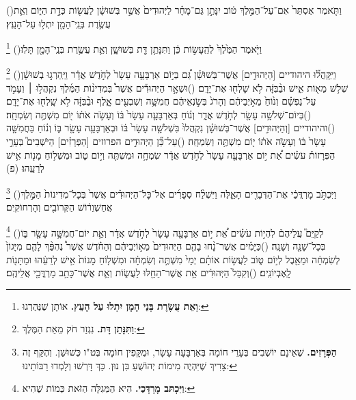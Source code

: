 \documentclass[12pt, openany]{book}
\newcommand{\footnotecomment}[1]{
	\renewcommand\thefootnote{}
	\footnote{\textsf{#1}}}
\newcommand{\commenta}[1]{\footnotecomment{#1}\hspace{0em}}
\newcommand{\vsnum}[1]{(\hebrewnumeral{#1})\space}
\begin{document}
\begin{multicols}{2}
\vsnum{13}וַתֹּ֤אמֶר אֶסְתֵּר֙ אִם־עַל־הַמֶּ֣לֶךְ ט֔וֹב יִנָּתֵ֣ן גַּם־מָחָ֗ר לַיְּהוּדִים֙ אֲשֶׁ֣ר בְּשׁוּשָׁ֔ן לַעֲשׂ֖וֹת כְּדָ֣ת הַיּ֑וֹם וְאֵ֛ת עֲשֶׂ֥רֶת בְּנֵֽי־הָמָ֖ן יִתְל֥וּ עַל־הָעֵֽץ׃%
\commenta{\textrm{\textbf{וְאֵת עֲשֶׂרֶת בְּנֵי הָמָן יִתְלוּ עַל הָעֵץ.}} אוֹתָן שֶׁנֶּהֶרְגוּ:}%
\vsnum{14}וַיֹּ֤אמֶר הַמֶּ֙לֶךְ֙ לְהֵֽעָשׂ֣וֹת כֵּ֔ן וַתִּנָּתֵ֥ן דָּ֖ת בְּשׁוּשָׁ֑ן וְאֵ֛ת עֲשֶׂ֥רֶת בְּנֵֽי־הָמָ֖ן תָּלֽוּ׃%
\commenta{\textrm{\textbf{וַתִּנָּתֵן דָּת.}} נִגְזַר חֹק מֵאֵת הַמֶּלֶךְ:}%
\vsnum{15}וַיִּֽקָּהֲל֞וּ היהודיים [הַיְּהוּדִ֣ים] אֲשֶׁר־בְּשׁוּשָׁ֗ן גַּ֠ם בְּי֣וֹם אַרְבָּעָ֤ה עָשָׂר֙ לְחֹ֣דֶשׁ אֲדָ֔ר וַיַּֽהַרְג֣וּ בְשׁוּשָׁ֔ן שְׁלֹ֥שׁ מֵא֖וֹת אִ֑ישׁ וּבַ֨בִּזָּ֔ה לֹ֥א שָׁלְח֖וּ אֶת־יָדָֽם׃
\vsnum{16}וּשְׁאָ֣ר הַיְּהוּדִ֡ים אֲשֶׁר֩ בִּמְדִינ֨וֹת הַמֶּ֜לֶךְ נִקְהֲל֣וּ ׀ וְעָמֹ֣ד עַל־נַפְשָׁ֗ם וְנ֙וֹחַ֙ מֵאֹ֣יְבֵיהֶ֔ם וְהָרֹג֙ בְּשֹׂ֣נְאֵיהֶ֔ם חֲמִשָּׁ֥ה וְשִׁבְעִ֖ים אָ֑לֶף וּבַ֨בִּזָּ֔ה לֹ֥א שָֽׁלְח֖וּ אֶת־יָדָֽם׃
\vsnum{17}בְּיוֹם־שְׁלֹשָׁ֥ה עָשָׂ֖ר לְחֹ֣דֶשׁ אֲדָ֑ר וְנ֗וֹחַ בְּאַרְבָּעָ֤ה עָשָׂר֙ בּ֔וֹ וְעָשֹׂ֣ה אֹת֔וֹ י֖וֹם מִשְׁתֶּ֥ה וְשִׂמְחָֽה׃
\vsnum{18}והיהודיים [וְהַיְּהוּדִ֣ים] אֲשֶׁר־בְּשׁוּשָׁ֗ן נִקְהֲלוּ֙ בִּשְׁלֹשָׁ֤ה עָשָׂר֙ בּ֔וֹ וּבְאַרְבָּעָ֥ה עָשָׂ֖ר בּ֑וֹ וְנ֗וֹחַ בַּחֲמִשָּׁ֤ה עָשָׂר֙ בּ֔וֹ וְעָשֹׂ֣ה אֹת֔וֹ י֖וֹם מִשְׁתֶּ֥ה וְשִׂמְחָֽה׃
\vsnum{19}עַל־כֵּ֞ן הַיְּהוּדִ֣ים הפרוזים [הַפְּרָזִ֗ים] הַיֹּשְׁבִים֮ בְּעָרֵ֣י הַפְּרָזוֹת֒ עֹשִׂ֗ים אֵ֠ת י֣וֹם אַרְבָּעָ֤ה עָשָׂר֙ לְחֹ֣דֶשׁ אֲדָ֔ר שִׂמְחָ֥ה וּמִשְׁתֶּ֖ה וְי֣וֹם ט֑וֹב וּמִשְׁל֥וֹחַ מָנ֖וֹת אִ֥ישׁ לְרֵעֵֽהוּ׃ (פ)%
\commenta{\textrm{\textbf{הַפְּרָזִים.}} שֶׁאֵינָם יוֹשְׁבִים בְּעָרֵי חוֹמָה בְּאַרְבָּעָה עָשָׂר, וּמֻקָּפִין חוֹמָה בְּט"ו כְּשׁוּשַׁן. וְהֶקֵּף זֶה צָרִיךְ שֶׁיִּהְיֶה מִימוֹת יְהוֹשֻׁעַ בִּן נוּן. כַּךְ דָּרְשׁוּ וְלָמְדוּ רַבּוֹתֵינוּ: }%
\vsnum{20}וַיִּכְתֹּ֣ב מָרְדֳּכַ֔י אֶת־הַדְּבָרִ֖ים הָאֵ֑לֶּה וַיִּשְׁלַ֨ח סְפָרִ֜ים אֶל־כָּל־הַיְּהוּדִ֗ים אֲשֶׁר֙ בְּכָל־מְדִינוֹת֙ הַמֶּ֣לֶךְ אֲחַשְׁוֵר֔וֹשׁ הַקְּרוֹבִ֖ים וְהָרְחוֹקִֽים׃%
\commenta{\textrm{\textbf{וַיִּכְתּב מָרְדְּכַי.}} הִיא הַמְּגִלָּה הַזֹּאת כְּמוֹת שֶׁהִיא:}%
\vsnum{21}לְקַיֵּם֮ עֲלֵיהֶם֒ לִהְי֣וֹת עֹשִׂ֗ים אֵ֠ת י֣וֹם אַרְבָּעָ֤ה עָשָׂר֙ לְחֹ֣דֶשׁ אֲדָ֔ר וְאֵ֛ת יוֹם־חֲמִשָּׁ֥ה עָשָׂ֖ר בּ֑וֹ בְּכָל־שָׁנָ֖ה וְשָׁנָֽה׃
\vsnum{22}כַּיָּמִ֗ים אֲשֶׁר־נָ֨חוּ בָהֶ֤ם הַיְּהוּדִים֙ מֵא֣וֹיְבֵיהֶ֔ם וְהַחֹ֗דֶשׁ אֲשֶׁר֩ נֶהְפַּ֨ךְ לָהֶ֤ם מִיָּגוֹן֙ לְשִׂמְחָ֔ה וּמֵאֵ֖בֶל לְי֣וֹם ט֑וֹב לַעֲשׂ֣וֹת אוֹתָ֗ם יְמֵי֙ מִשְׁתֶּ֣ה וְשִׂמְחָ֔ה וּמִשְׁל֤וֹחַ מָנוֹת֙ אִ֣ישׁ לְרֵעֵ֔הוּ וּמַתָּנ֖וֹת לָֽאֶבְיוֹנִֽים׃
\vsnum{23}וְקִבֵּל֙ הַיְּהוּדִ֔ים אֵ֥ת אֲשֶׁר־הֵחֵ֖לּוּ לַעֲשׂ֑וֹת וְאֵ֛ת אֲשֶׁר־כָּתַ֥ב מָרְדֳּכַ֖י אֲלֵיהֶֽם׃

\end{multicols}
\end{document}
